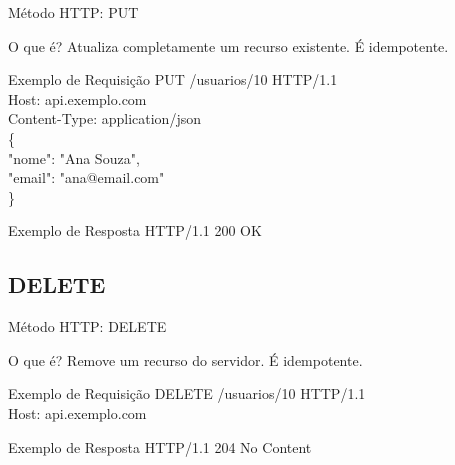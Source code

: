 \documentclass[9pt]{beamer}
\begin{document}
\begin{frame}{Método HTTP: PUT}

\begin{block}{O que é?}
Atualiza completamente um recurso existente.
É idempotente.
\end{block}

\begin{block}{Exemplo de Requisição}
\ttfamily\footnotesize
PUT /usuarios/10 HTTP/1.1 \\
Host: api.exemplo.com \\
Content-Type: application/json \\

\{ \\
\quad "nome": "Ana Souza", \\
\quad "email": "ana@email.com" \\
\}
\end{block}

\begin{block}{Exemplo de Resposta}
\ttfamily\footnotesize
HTTP/1.1 200 OK
\end{block}

\begin{center}
\end{center}

\end{frame}

\subsection{DELETE}

\begin{frame}{Método HTTP: DELETE}

\begin{block}{O que é?}
Remove um recurso do servidor.
É idempotente.
\end{block}

\begin{block}{Exemplo de Requisição}
\ttfamily\footnotesize
DELETE /usuarios/10 HTTP/1.1 \\
Host: api.exemplo.com
\end{block}

\begin{block}{Exemplo de Resposta}
\ttfamily\footnotesize
HTTP/1.1 204 No Content
\end{block}

\begin{center}
\end{center}

\end{frame}
\end{document}
